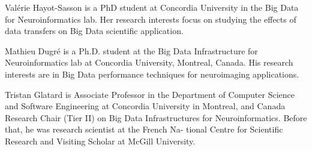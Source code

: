 \documentclass[10pt,journal,compsoc]{IEEEtran}
\begin{document}






\begin{IEEEbiography}{Val\'erie Hayot-Sasson} is a PhD student at Concordia University in the Big Data for Neuroinformatics lab. Her research interests focus on studying the effects of data transfers on Big Data scientific application.
\end{IEEEbiography}
\begin{IEEEbiography}{Mathieu Dugr\'e} is a Ph.D. student at the Big Data Infrastructure for Neuroinformatics lab at Concordia University, Montreal, Canada. His research interests are in Big Data performance techniques for neuroimaging applications.

\end{IEEEbiography}
\begin{IEEEbiography}{Tristan Glatard} is Associate Professor in the
Department of Computer Science and Software
Engineering at Concordia University in Montreal,
and Canada Research Chair (Tier II) on Big
Data Infrastructures for Neuroinformatics. Before
that, he was research scientist at the French Na-
tional Centre for Scientific Research and Visiting
Scholar at McGill University.
\end{IEEEbiography}
\end{document}
